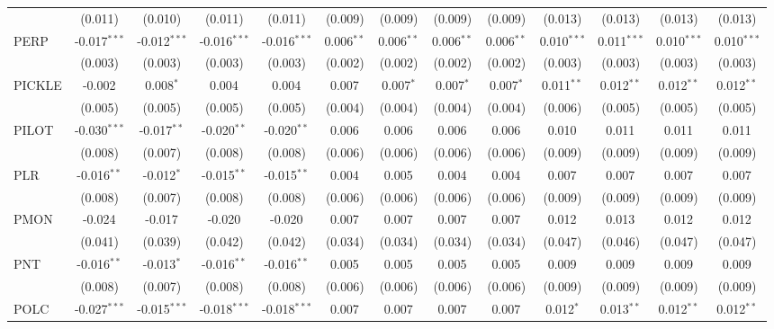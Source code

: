 \begin{table}[!htbp]
\begin{tabular}{@{\extracolsep{5pt}}lcccccccccccc}
  & (0.011) & (0.010) & (0.011) & (0.011) & (0.009) & (0.009) & (0.009) & (0.009) & (0.013) & (0.013) & (0.013) & (0.013) \\
 PERP & -0.017$^{***}$ & -0.012$^{***}$ & -0.016$^{***}$ & -0.016$^{***}$ & 0.006$^{**}$ & 0.006$^{**}$ & 0.006$^{**}$ & 0.006$^{**}$ & 0.010$^{***}$ & 0.011$^{***}$ & 0.010$^{***}$ & 0.010$^{***}$ \\
  & (0.003) & (0.003) & (0.003) & (0.003) & (0.002) & (0.002) & (0.002) & (0.002) & (0.003) & (0.003) & (0.003) & (0.003) \\
 PICKLE & -0.002$^{}$ & 0.008$^{*}$ & 0.004$^{}$ & 0.004$^{}$ & 0.007$^{}$ & 0.007$^{*}$ & 0.007$^{*}$ & 0.007$^{*}$ & 0.011$^{**}$ & 0.012$^{**}$ & 0.012$^{**}$ & 0.012$^{**}$ \\
  & (0.005) & (0.005) & (0.005) & (0.005) & (0.004) & (0.004) & (0.004) & (0.004) & (0.006) & (0.005) & (0.005) & (0.005) \\
 PILOT & -0.030$^{***}$ & -0.017$^{**}$ & -0.020$^{**}$ & -0.020$^{**}$ & 0.006$^{}$ & 0.006$^{}$ & 0.006$^{}$ & 0.006$^{}$ & 0.010$^{}$ & 0.011$^{}$ & 0.011$^{}$ & 0.011$^{}$ \\
  & (0.008) & (0.007) & (0.008) & (0.008) & (0.006) & (0.006) & (0.006) & (0.006) & (0.009) & (0.009) & (0.009) & (0.009) \\
 PLR & -0.016$^{**}$ & -0.012$^{*}$ & -0.015$^{**}$ & -0.015$^{**}$ & 0.004$^{}$ & 0.005$^{}$ & 0.004$^{}$ & 0.004$^{}$ & 0.007$^{}$ & 0.007$^{}$ & 0.007$^{}$ & 0.007$^{}$ \\
  & (0.008) & (0.007) & (0.008) & (0.008) & (0.006) & (0.006) & (0.006) & (0.006) & (0.009) & (0.009) & (0.009) & (0.009) \\
 PMON & -0.024$^{}$ & -0.017$^{}$ & -0.020$^{}$ & -0.020$^{}$ & 0.007$^{}$ & 0.007$^{}$ & 0.007$^{}$ & 0.007$^{}$ & 0.012$^{}$ & 0.013$^{}$ & 0.012$^{}$ & 0.012$^{}$ \\
  & (0.041) & (0.039) & (0.042) & (0.042) & (0.034) & (0.034) & (0.034) & (0.034) & (0.047) & (0.046) & (0.047) & (0.047) \\
 PNT & -0.016$^{**}$ & -0.013$^{*}$ & -0.016$^{**}$ & -0.016$^{**}$ & 0.005$^{}$ & 0.005$^{}$ & 0.005$^{}$ & 0.005$^{}$ & 0.009$^{}$ & 0.009$^{}$ & 0.009$^{}$ & 0.009$^{}$ \\
  & (0.008) & (0.007) & (0.008) & (0.008) & (0.006) & (0.006) & (0.006) & (0.006) & (0.009) & (0.009) & (0.009) & (0.009) \\
 POLC & -0.027$^{***}$ & -0.015$^{***}$ & -0.018$^{***}$ & -0.018$^{***}$ & 0.007$^{}$ & 0.007$^{}$ & 0.007$^{}$ & 0.007$^{}$ & 0.012$^{*}$ & 0.013$^{**}$ & 0.012$^{**}$ & 0.012$^{**}$ \\

\end{tabular}
\end{table}
